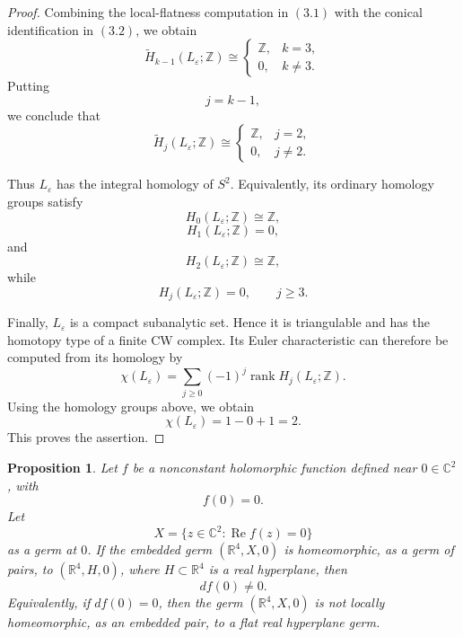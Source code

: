 \documentclass[11pt]{amsart}
\newtheorem{proposition}[theorem]{Proposition}
\theoremstyle{definition}
\theoremstyle{remark}
\begin{document}
\begin{proof}
Combining the local-flatness computation in \((3.1)\) with the conical
identification in \((3.2)\), we obtain
\[
\widetilde H_{k-1}(L_\varepsilon;\mathbb Z)
\cong
\begin{cases}
\mathbb Z, & k=3,\\
0, & k\ne3.
\end{cases}
\]
Putting
\[
j=k-1,
\]
we conclude that
\[
\widetilde H_j(L_\varepsilon;\mathbb Z)
\cong
\begin{cases}
\mathbb Z, & j=2,\\
0, & j\ne2.
\end{cases}
\]

Thus \(L_\varepsilon\) has the integral homology of \(S^2\). Equivalently,
its ordinary homology groups satisfy
\[
H_0(L_\varepsilon;\mathbb Z)\cong\mathbb Z,
\]
\[
H_1(L_\varepsilon;\mathbb Z)=0,
\]
and
\[
H_2(L_\varepsilon;\mathbb Z)\cong\mathbb Z,
\]
while
\[
H_j(L_\varepsilon;\mathbb Z)=0,
\qquad j\ge3.
\]

Finally, \(L_\varepsilon\) is a compact subanalytic set. Hence it is
triangulable and has the homotopy type of a finite CW complex. Its Euler
characteristic can therefore be computed from its homology by
\[
\chi(L_\varepsilon)
=
\sum_{j\ge0}
(-1)^j
\operatorname{rank}
H_j(L_\varepsilon;\mathbb Z).
\]
Using the homology groups above, we obtain
\[
\chi(L_\varepsilon)
=
1-0+1
=
2.
\]
This proves the assertion.
\end{proof}




\begin{proposition}\label{prop:real-part-link}
Let $f$ be a nonconstant holomorphic function defined near $0\in \mathbb C^2$, with
\[
        f(0)=0.
\]
Let
\[
        X=\{z\in\mathbb C^2:\operatorname{Re} f(z)=0\}
\]
as a germ at $0$. If the embedded germ $(\mathbb R^4,X,0)$ is homeomorphic, as a germ of pairs, to $(\mathbb R^4,H,0)$, where $H\subset\mathbb R^4$ is a real hyperplane, then
\[
        df(0)\ne 0.
\]
Equivalently, if $df(0)=0$, then the germ $(\mathbb R^4,X,0)$ is not locally homeomorphic, as an embedded pair, to a flat real hyperplane germ.
\end{proposition}
\end{document}
